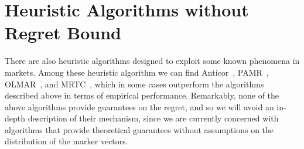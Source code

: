 
\section{Heuristic Algorithms without Regret Bound}

There are also heuristic algorithms designed to exploit some known phenomena in markets. Among these heuristic algorithm we can find Anticor~\cite{borodin2004can}, PAMR~\cite{li2012pamr}, OLMAR~\cite{li2015moving}, and MRTC~\cite{yang2018reversion}, which in some cases outperform the algorithms described above in terms of empirical performance. 
Remarkably, none of the above algorithms provide guarantees on the regret, and so we will avoid an in-depth description of their mechanism, since we are currently concerned with algorithms that provide theoretical guarantees without assumptions on the distribution of the marker vectors.